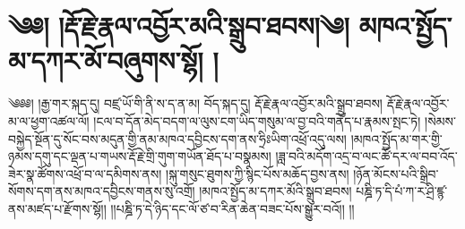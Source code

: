 \chapter{༄༅། །རྡོ་རྗེ་རྣལ་འབྱོར་མའི་སྒྲུབ་ཐབས།༄། མཁའ་སྤྱོད་མ་དཀར་མོ་བཞུགས་སྷོ། ། }༄༅༅། །རྒྱ་གར་སྐད་དུ། བཛྲ་ཡོ་གི་ནི་ས་ད་ན་མ། བོད་སྐད་དུ། རྡོ་རྗེ་རྣལ་འབྱོར་མའི་སྒྲུབ་ཐབས། རྡོ་རྗེ་རྣལ་འབྱོར་མ་ལ་ཕྱག་འཚལ་ལོ། །ངལ་བ་དོན་མེད་བདག་ལ་ལུས་ངག་ཡིད་གསུམ་ལ་བྱ་བའི་གནོད་པ་རྣམས་སྤང་ཏེ། །སེམས་བསྐྱེད་སྔོན་དུ་སོང་བས་མདུན་གྱི་ནམ་མཁའ་དབྱིངས་དག་ནས་ཧྲིཿཡིག་འཕྲོ་འདུ་ལས། །མཁའ་སྤྱོད་མ་གར་གྱི་ཉམས་དགུ་དང་ལྡན་པ་གཡས་རྡོ་རྗེ་གྲི་གུག་གཡོན་ཐོད་པ་བསྣམས། །ཟླ་བའི་མདོག་འདྲ་བ་ལང་ཚོ་དར་ལ་བབ་འོད་ཟེར་སྣ་ཚོགས་འཕྲོ་བ་ལ་དམིགས་ནས། །སྐུ་གསུང་ཐུགས་ཀྱི་སྙིང་པོས་མཆོད་བྱས་ནས། །ཉོན་མོངས་པའི་སྒྲིབ་སོགས་དག་ནས་མཁའ་དབྱིངས་གནས་སུ་འགྲོ། །མཁའ་སྤྱོད་མ་དཀར་མོའི་སྒྲུབ་ཐབས། པཎྜི་ཏ་དི་པཾ་ཀ་ར་ཤྲི་ཛྙ་ནས་མཛད་པ་རྫོགས་སྷོ།། །།པཎྜི་ཏ་དེ་ཉིད་དང་ལོ་ཙ་བ་རིན་ཆེན་བཟང་པོས་སྒྱུར་བའོ།། །།